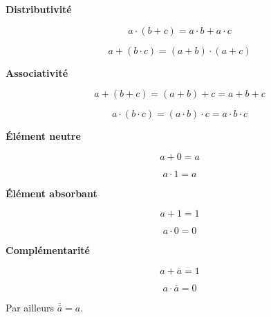 \documentclass[10pt]{article}
\begin{document}
\begin{prop}
\textbf{Distributivité}

\begin{minipage}[c]{.45\linewidth}
$$ a\cdot (b+c) = a\cdot b+a \cdot c$$
\end{minipage}\hfill
\begin{minipage}[c]{.45\linewidth}
$$ a+(b\cdot c) = (a+b) \cdot (a+c)$$
\end{minipage}
\end{prop}

\begin{prop}
\textbf{Associativité}

\begin{minipage}[c]{.45\linewidth}
$$ a + (b+c) = (a+b)+c = a+b+c$$
\end{minipage}\hfill
\begin{minipage}[c]{.45\linewidth}
$$ a \cdot (b\cdot c) = (a\cdot b)\cdot c = a \cdot b\cdot c$$
\end{minipage}
\end{prop}

\begin{prop}
\textbf{Élément neutre}

\begin{minipage}[c]{.45\linewidth}
$$ a + 0 = a$$
\end{minipage}\hfill
\begin{minipage}[c]{.45\linewidth}
$$ a\cdot 1 = a$$
\end{minipage}
\end{prop}

\begin{prop}
\textbf{Élément absorbant}

\begin{minipage}[c]{.45\linewidth}
$$ a + 1 = 1$$
\end{minipage}\hfill
\begin{minipage}[c]{.45\linewidth}
$$ a\cdot 0 = 0$$
\end{minipage}
\end{prop}



\begin{prop}
\textbf{Complémentarité}

\begin{minipage}[c]{.45\linewidth}
$$ a + \overline{a} = 1$$
\end{minipage}\hfill
\begin{minipage}[c]{.45\linewidth}
$$ a\cdot \overline{a} = 0$$
\end{minipage}

Par ailleurs $\overline{\overline{a}}=a$.
\end{prop}
\end{document}
